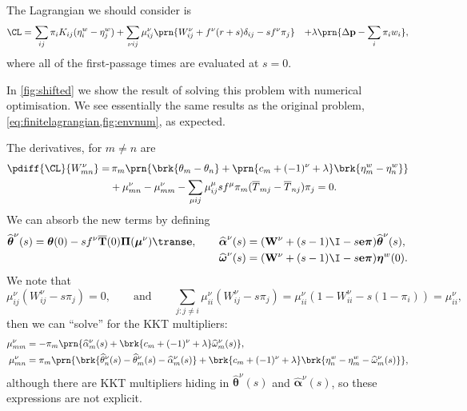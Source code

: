 \documentclass[12pt]{article}
\newcommand{\onev}{\mathbf{e}}
\newcommand{\prm}{p}
\newcommand{\pr}{\mathbf{\prm}}
\newcommand{\eqm}{\pi}
\newcommand{\eq}{\boldsymbol{\eqm}}
\newcommand{\Eqm}{\Pi}
\newcommand{\Eq}{\boldsymbol{\Eqm}}
\newcommand{\fptm}{T}
\newcommand{\fpt}{\mathbf{\fptm}}
\newcommand{\fptbm}{\overline{\fptm}}
\newcommand{\fptb}{\overline{\fpt}}
\newcommand{\etwm}{\eta^w}
\newcommand{\etw}{\boldsymbol{\eta}^w}
\newcommand{\thbm}{\theta}
\newcommand{\thb}{\boldsymbol{\thbm}}
\newcommand{\ombm}{\omega}
\newcommand{\omb}{\boldsymbol{\ombm}}
\newcommand{\albm}{\alpha}
\newcommand{\alb}{\boldsymbol{\albm}}
\newcommand{\wm}{w}
\newcommand{\Wm}{W}
\newcommand{\W}{\mathbf{\Wm}}
\newcommand{\encm}{K}
\newcommand{\shift}[1]{\widehat{#1}}
\begin{document}
The Lagrangian we should consider is
%
\begin{equation}\label{eq:lshiftlagrangian}
\begin{aligned}
  \CL =&\, \sum_{ij} \eqm_i \encm_{ij} (\etwm_i - \etwm_j)
        +\sum_{\nu i j} \mu^\nu_{ij}\prn{\Wm^\nu_{ij} + f^\nu (r + s) \delta_{ij} -  s f^\nu \eqm_j }
        &+ \lambda \prn{ \Delta\pr - \sum_i \eqm_i \wm_i },
\end{aligned}
\end{equation}
%
where all of the first-passage times are evaluated at \(s = 0\).

In \cref{fig:shifted} we show the result of solving this problem with numerical optimisation.
We see essentially the same results as the original problem, \cref{eq:finitelagrangian,fig:envnum}, as expected.

The derivatives, for \(m \neq n\) are
%
\begin{equation}\label{eq:lshiftderivs}
\begin{aligned}
  \pdiff{\CL}{\Wm^\nu_{mn}} = & \,
    \eqm_m \prn{ \brk{\thbm_m - \thbm_n}
     + \prn{{c}_m + (-1)^\nu + \lambda} \brk{\etwm_m - \etwm_n} } \\
     &+ \mu^\nu_{mn} -  \mu^\nu_{mm}
     - \sum_{\mu ij} \mu^\mu_{ij} s f^\mu \eqm_m (\fptbm_{mj} - \fptbm_{nj}) \eqm_j
    = 0.
\end{aligned}
\end{equation}
%
We can absorb the new terms by defining
%
\begin{equation*}
\begin{aligned}
  \shift{\thb}^\nu(s) = \thb(0) - s f^\nu \fptb(0) \Eq (\boldsymbol{\mu}^\nu)\trans \onev,
  \qquad
  \shift{\alb}^\nu(s) &= (\W^\nu + (s - 1) \I - s \onev \eq) \shift{\thb}^\nu(s),
  \\
  \shift{\omb}^\nu(s) &= (\W^\nu + (s - 1) \I - s \onev \eq) \etw(0).
\end{aligned}
\end{equation*}
%
We note that
%
\begin{equation*}
  \mu^\nu_{ij} (\Wm^\nu_{ij} - s \eqm_j) = 0,
  \qquad \text{and} \qquad
  \sum_{j: j \neq i} \mu^\nu_{ii} (\Wm^\nu_{ij} - s \eqm_j)
      = \mu^\nu_{ii} (1 - \Wm^\nu_{ii} - s (1 - \eqm_i)) = \mu^\nu_{ii},
\end{equation*}
%
then we can ``solve'' for the KKT multipliers:
%
\begin{equation}\label{eq:lshiftsol}
\begin{aligned}
  \mu^\nu_{mm} &= - \eqm_m \prn{ \shift{\albm}^\nu_m(s) 
    + \brk{ {c}_m + (-1)^\nu + \lambda } \shift{\ombm}^\nu_m(s)
    }, \\
  \mu^\nu_{mn} &= \eqm_m \prn{ 
      \brk{ \shift{\thbm}^\nu_n(s) - \shift{\thbm}^\nu_m(s) - \shift{\albm}^\nu_m(s) }
    + \brk{ {c}_m + (-1)^\nu + \lambda } 
        \brk{ \etwm_n - \etwm_m - \shift{\ombm}^\nu_m(s) }
     }, \\
\end{aligned}
\end{equation}
%
although there are KKT multipliers hiding in \(\shift{\thb}^\nu(s)\) and \(\shift{\alb}^\nu(s)\), so these expressions are not explicit.
\end{document}
